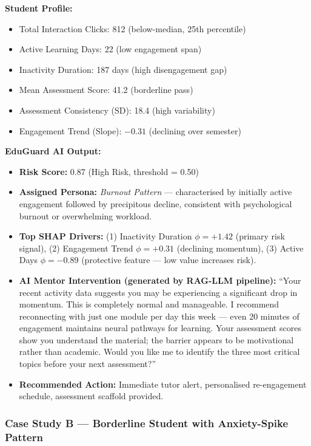 \textbf{Student Profile:}
\begin{itemize}[nosep]
  \item Total Interaction Clicks: 812 (below-median, 25th percentile)
  \item Active Learning Days: 22 (low engagement span)
  \item Inactivity Duration: 187 days (high disengagement gap)
  \item Mean Assessment Score: 41.2 (borderline pass)
  \item Assessment Consistency (SD): 18.4 (high variability)
  \item Engagement Trend (Slope): $-0.31$ (declining over semester)
\end{itemize}

\textbf{EduGuard AI Output:}
\begin{itemize}[nosep]
  \item \textbf{Risk Score:} 0.87 (High Risk, threshold = 0.50)
  \item \textbf{Assigned Persona:} \textit{Burnout Pattern} —
    characterised by initially active engagement followed by
    precipitous decline, consistent with psychological burnout or
    overwhelming workload.
  \item \textbf{Top SHAP Drivers:}
    (1) Inactivity Duration $\phi = +1.42$ (primary risk signal),
    (2) Engagement Trend $\phi = +0.31$ (declining momentum),
    (3) Active Days $\phi = -0.89$ (protective feature — low value increases risk).
  \item \textbf{AI Mentor Intervention (generated by RAG-LLM pipeline):}
    ``Your recent activity data suggests you may be experiencing a
    significant drop in momentum. This is completely normal and manageable.
    I recommend reconnecting with just one module per day this week —
    even 20 minutes of engagement maintains neural pathways for learning.
    Your assessment scores show you understand the material; the barrier
    appears to be motivational rather than academic. Would you like me to
    identify the three most critical topics before your next assessment?''
  \item \textbf{Recommended Action:} Immediate tutor alert, personalised
    re-engagement schedule, assessment scaffold provided.
\end{itemize}

\subsubsection{Case Study B — Borderline Student with Anxiety-Spike Pattern}

